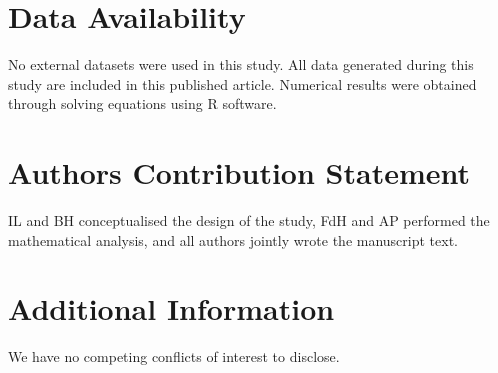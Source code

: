 \documentclass[11pt]{article}
\numberwithin{equation}{section}
\begin{document}

\section*{Data Availability}
No external datasets were used in this study. All data generated during this study are included in this published article. Numerical results were obtained through solving equations using R software.

\section*{Authors Contribution Statement} IL and BH conceptualised the design of the study, FdH and AP performed the mathematical analysis, and all authors jointly wrote the manuscript text.

\section*{Additional Information}

We have no competing conflicts of interest to disclose.

\end{document}
